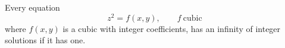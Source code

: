 \begin{proposition}\label{eq:102}
    Every equation
\[
    z^2=f(x,y),\qquad f\ \text{cubic}
\]
    where $f(x,y)$ is a cubic with integer coefficients, has an infinity of integer solutions if it has one.
\end{proposition}

